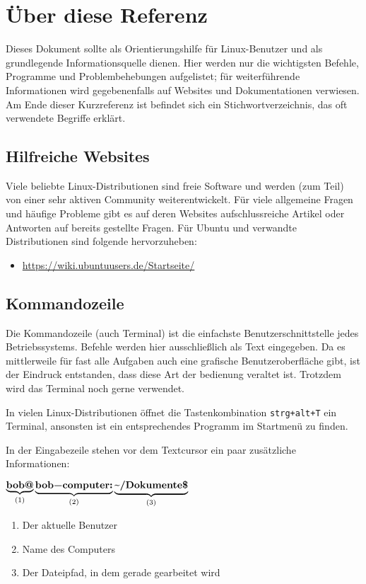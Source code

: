\section {Über diese Referenz}
Dieses Dokument sollte als Orientierungshilfe für Linux-Benutzer und als grundlegende Informationsquelle dienen. Hier werden nur die wichtigsten Befehle, Programme und Problembehebungen aufgelistet; für weiterführende Informationen wird gegebenenfalls auf Websites und Dokumentationen verwiesen. Am Ende dieser Kurzreferenz ist befindet sich ein Stichwortverzeichnis, das oft verwendete Begriffe erklärt.

\subsection {Hilfreiche Websites}
Viele beliebte Linux-Distributionen sind freie Software und werden (zum Teil) von einer sehr aktiven Community weiterentwickelt. Für viele allgemeine Fragen und häufige Probleme gibt es auf deren Websites aufschlussreiche Artikel oder Antworten auf bereits gestellte Fragen. Für Ubuntu und verwandte Distributionen sind folgende hervorzuheben:

\begin{itemize}
	\item \url{https://wiki.ubuntuusers.de/Startseite/}
\end{itemize}

\subsection{Kommandozeile}
Die Kommandozeile (auch Terminal) ist die einfachste Benutzerschnittstelle jedes Betriebssystems. Befehle werden hier ausschließlich als Text eingegeben. Da es mittlerweile für fast alle Aufgaben auch eine grafische Benutzeroberfläche gibt, ist der Eindruck entstanden, dass diese Art der bedienung veraltet ist. Trotzdem wird das Terminal noch gerne verwendet. %

In vielen Linux-Distributionen öffnet die Tastenkombination \lstinline$strg+alt+T$ ein Terminal, ansonsten ist ein entsprechendes Programm im Startmenü zu finden.

In der Eingabezeile stehen vor dem Textcursor ein paar zusätzliche Informationen:

\( \underbrace{\textbf{\lstinline|bob@|}}_{(1)}\underbrace{\textbf{\lstinline|bob-computer:|}}_{(2)}\underbrace{\textbf{\textapprox\lstinline|/Dokumente$|}}_{(3)} \)

\begin{enumerate}
\item Der aktuelle Benutzer
\item Name des Computers
\item Der Dateipfad, in dem gerade gearbeitet wird
\end{enumerate}

